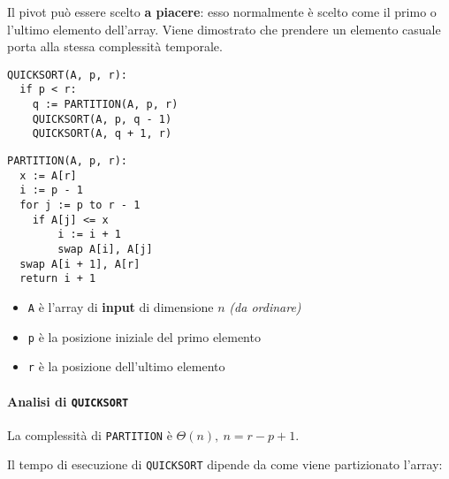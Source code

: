 \documentclass[italian, 10pt]{article}
\begin{document}
\bigskip
Il pivot può essere scelto \textbf{a piacere}: esso normalmente è scelto come il primo o l'ultimo elemento dell'array.
Viene dimostrato che prendere un elemento casuale porta alla stessa complessità temporale.

\begin{minipage}[t]{0.495\textwidth}
  \begin{lstlisting}[style=pseudocode, caption={Pseudocodice di \texttt{QUICKSORT}}, label={sec:algoritmo-quicksort}]
QUICKSORT(A, p, r):
  if p < r:
    q := PARTITION(A, p, r)
    QUICKSORT(A, p, q - 1)
    QUICKSORT(A, q + 1, r)
  \end{lstlisting}
\end{minipage}
\begin{minipage}[t]{0.495\textwidth}
  \begin{lstlisting}[style=pseudocode, caption={Pseudocodice di \texttt{PARTITION}}, label={sec:algoritmo-partition}]
PARTITION(A, p, r):
  x := A[r]
  i := p - 1
  for j := p to r - 1
    if A[j] <= x
        i := i + 1
        swap A[i], A[j]
  swap A[i + 1], A[r]
  return i + 1
  \end{lstlisting}
\end{minipage}

\begin{itemize}
  \item \texttt{A} è l'array di \textbf{input} di dimensione \(n\) \textit{(da ordinare)}
  \item \texttt{p} è la posizione iniziale del primo elemento
  \item \texttt{r} è la posizione dell'ultimo elemento
\end{itemize}

\paragraph{Analisi di \texttt{QUICKSORT}}

La complessità di \texttt{PARTITION} è \(\Theta(n),\ n = r - p + 1\).

\bigskip
Il tempo di esecuzione di \texttt{QUICKSORT} dipende da come viene partizionato l'array:
\end{document}
